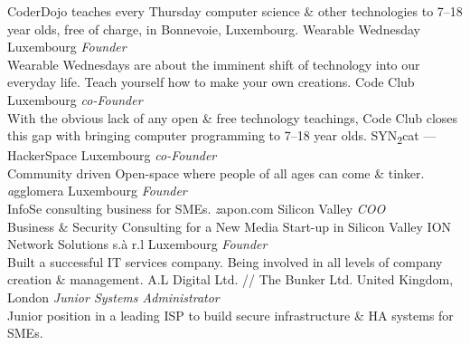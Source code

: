 \documentclass[a4paper]{friggeri-cv} %
\begin{document}
\begin{entrylist}
{CoderDojo teaches every Thursday computer science \& other technologies to 7--18 year olds, free of charge, in Bonnevoie, Luxembourg.}
{Wearable Wednesday}
{Luxembourg}
{\emph{Founder} \\
Wearable Wednesdays are about the imminent shift of technology into our everyday life. Teach yourself how to make your own creations.}
{Code Club}
{Luxembourg}
{\emph{co-Founder} \\
With the obvious lack of any open \& free technology teachings, Code Club closes this gap with bringing computer programming to 7--18 year olds.}
{SYN\textsubscript{2}cat --- HackerSpace}
{Luxembourg}
{\emph{co-Founder} \\
Community driven Open-space where people of all ages can come \& tinker.}
{\emph{a}gglomera}
{Luxembourg}
{\emph{Founder} \\
InfoSe consulting business for SMEs.}
{\emph{z}apon.com}
{Silicon Valley}
{\emph{COO} \\
Business \& Security Consulting for a New Media Start-up in Silicon Valley}
{ION Network Solutions s.\`{a} r.l}
{Luxembourg}
{\emph{Founder} \\
Built a successful IT services company. Being involved in all levels of company creation \& management.}
{A.L Digital Ltd. // The Bunker Ltd.}
{United Kingdom, London}
{\emph{Junior Systems Administrator} \\
Junior position in a leading ISP to build secure infrastructure \& HA systems for SMEs.}
\end{entrylist}


\end{document}
